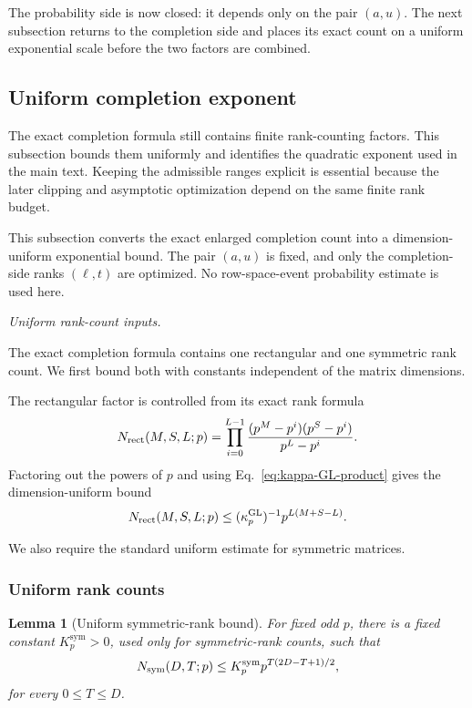 \documentclass[11pt]{article}
\newcommand{\1}{\mathbf 1}
\theoremstyle{plain}
\newtheorem{lemma}[theorem]{Lemma}
\theoremstyle{definition}
\theoremstyle{remark}
\begin{document}
The probability side is now closed: it depends only on the pair $(a,u)$.
The next subsection returns to the completion side and places its exact count on a
uniform exponential scale before the two factors are combined.

\subsection{Uniform completion exponent}
The exact completion formula still contains finite rank-counting factors.  This subsection bounds them uniformly and identifies the quadratic exponent used in the main text.  Keeping the admissible ranges explicit is essential because the later clipping and asymptotic optimization depend on the same finite rank budget.
\label{sec:uniform-completion-exponent}


This subsection converts the exact enlarged completion count into a
dimension-uniform exponential bound.  The pair $(a,u)$ is fixed, and only the
completion-side ranks $(\ell,t)$ are optimized.  No
row-space-event probability estimate is used here.

\medskip\noindent\emph{Uniform rank-count inputs.}\par
The exact completion formula contains one rectangular and one symmetric rank
count.  We first bound both with constants independent of the matrix
dimensions.

The rectangular factor is controlled from its exact rank formula
\begin{equation}
 N_{\rm rect}(M,S,L;p)
 =\prod_{i=0}^{L-1}
 \frac{(p^M-p^i)(p^S-p^i)}{p^L-p^i}.
 \label{eq:rectangular-exact-formula}
\end{equation}
Factoring out the powers of $p$ and using
Eq.~\eqref{eq:kappa-GL-product} gives the dimension-uniform bound
\begin{equation}
 N_{\rm rect}(M,S,L;p)
 \le (\kappa_p^{\mathrm{GL}})^{-1}p^{L(M+S-L)}.
 \label{eq:rectangular-uniform-bound}
\end{equation}

We also require the standard uniform estimate for symmetric matrices.

\subsubsection{Uniform rank counts}
\label{subsubsec:odd-uniform-rank-counts}

\begin{lemma}[Uniform symmetric-rank bound]
\label{lem:symmetric-rank-bound}
For fixed odd $p$, there is a fixed constant $K_p^{\mathrm{sym}}>0$, used only for symmetric-rank counts, such that
\begin{equation}
 N_{\rm sym}(D,T;p)
 \le K_p^{\mathrm{sym}}p^{T(2D-T+1)/2},
 \label{eq:symmetric-rank-bound}
\end{equation}
for every $0\le T\le D$.
\end{lemma}
\end{document}
